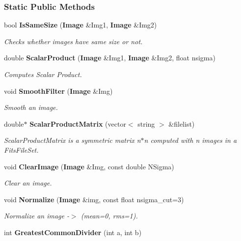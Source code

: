 \subsubsection*{Static Public Methods}
\begin{CompactItemize}
\item 
{}
bool {\bf Is\-Same\-Size} ({\bf Image} \&Img1, {\bf Image} \&Img2)\label{class_fringeutils_d0}

\begin{CompactList}\small\item\em Checks whether images have same size or not.\item\end{CompactList}\item 
double {\bf Scalar\-Product} ({\bf Image} \&Img1, {\bf Image} \&Img2, float nsigma)
\begin{CompactList}\small\item\em Computes Scalar Product.\item\end{CompactList}\item 
void {\bf Smooth\-Filter} ({\bf Image} \&Img)
\begin{CompactList}\small\item\em Smooth an image.\item\end{CompactList}\item 
double$\ast$ {\bf Scalar\-Product\-Matrix} (vector$<$ string $>$ \&filelist)
\begin{CompactList}\small\item\em Scalar\-Product\-Matrix is a symmetric matrix n$\ast$n computed with n images in a Fits\-File\-Set.\item\end{CompactList}\item 
void {\bf Clear\-Image} ({\bf Image} \&Img, const double NSigma)
\begin{CompactList}\small\item\em Clear an image.\item\end{CompactList}\item 
void {\bf Normalize} ({\bf Image} \&img, const float nsigma\_\-cut=3)
\begin{CompactList}\small\item\em Normalize an image -$>$ (mean=0, rms=1).\item\end{CompactList}\item 
{}
int {\bf Greatest\-Common\-Divider} (int a, int b)\label{class_fringeutils_d6}


\end{CompactItemize}
